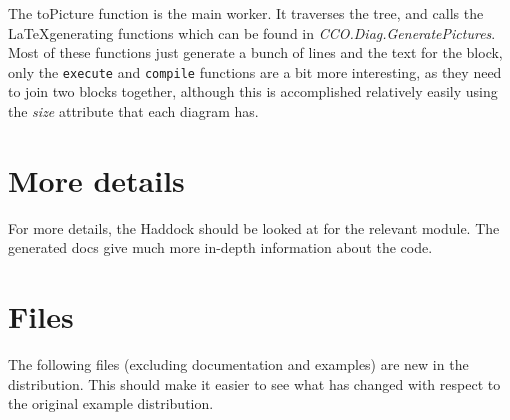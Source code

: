 \documentclass[a4paper]{article}
\begin{document}
The toPicture function is the main worker. It traverses the tree, and calls the \LaTeX\-generating functions which can be found in \emph{CCO.Diag.GeneratePictures}. Most of these functions just generate a bunch of lines and the text for the block, only the \texttt{execute} and \texttt{compile} functions are a bit more interesting, as they need to join two blocks together, although this is accomplished relatively easily using the \emph{size} attribute that each diagram has. 

\section{More details}

For more details, the Haddock should be looked at for the relevant module. The generated docs give much more in-depth information about the code. 

\section{Files}

The following files (excluding documentation and examples) are new in the distribution. This should make it easier to see what has changed with respect to the original example distribution. 
\end{document}
